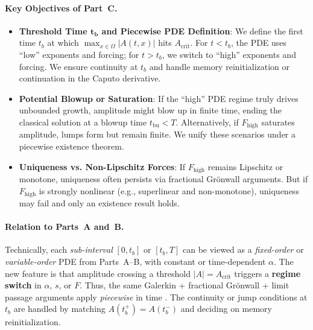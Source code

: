 \documentclass[12pt]{article}
\begin{document}
\paragraph{Key Objectives of Part~C.}
\begin{itemize}
    \item \textbf{Threshold Time \(\boldsymbol{t_b}\) and Piecewise PDE Definition}: We define the first time \(t_b\) at which \(\max_{x\in\Omega}\lvert A(t,x)\rvert\) hits \(A_{\mathrm{crit}}\). For \(t<t_b\), the PDE uses “low” exponents and forcing; for \(t>t_b\), we switch to “high” exponents and forcing. We ensure continuity at \(t_b\) and handle memory reinitialization or continuation in the Caputo derivative.
    \item \textbf{Potential Blowup or Saturation}: 
    If the “high” PDE regime truly drives unbounded growth, amplitude might blow up in finite time, ending the classical solution at a blowup time \(t_{\mathrm{bu}}<T\). Alternatively, if \(F_{\mathrm{high}}\) saturates amplitude, lumps form but remain finite. We unify these scenarios under a piecewise existence theorem.
    \item \textbf{Uniqueness vs. Non-Lipschitz Forces}: 
    If \(F_{\mathrm{high}}\) remains Lipschitz or monotone, uniqueness often persists via fractional Grönwall arguments. But if \(F_{\mathrm{high}}\) is strongly nonlinear (e.g., superlinear and non-monotone), uniqueness may fail and only an existence result holds.
\end{itemize}

\paragraph{Relation to Parts~A and~B.}
Technically, each \emph{sub-interval} $[0,t_b]$ or $[t_b,T]$ can be viewed as a \emph{fixed-order} or \emph{variable-order} PDE from Parts~A--B, with constant or time-dependent \(\alpha\). The new feature is that amplitude crossing a threshold \(\lvert A\rvert=A_{\mathrm{crit}}\) triggers a \textbf{regime switch} in \(\alpha\), \(s\), or $F$. Thus, the same Galerkin + fractional Grönwall + limit passage arguments apply \emph{piecewise} in time . The continuity or jump conditions at $t_b$ are handled by matching $A(t_b^+)=A(t_b^-)$ and deciding on memory reinitialization.
\end{document}
